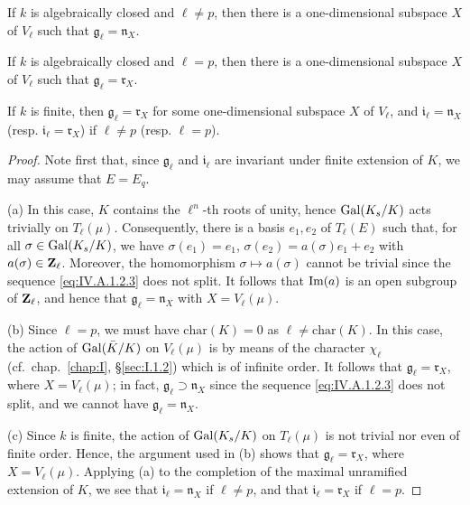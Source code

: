 \begin{theorem}
\begin{alist}
\item If $k$ is algebraically closed and $\ell\neq p$, then there is a
one-dimensional subspace $X$ of $V_\ell$ such that
$\mathfrak{g}_\ell=\mathfrak{n}_X$.
\item If $k$ is algebraically closed and $\ell=p$, then there is a
one-dimensional subspace $X$ of $V_\ell$ such that
$\mathfrak{g}_\ell=\mathfrak{r}_X$.
\item If $k$ is finite, then $\mathfrak{g}_\ell=\mathfrak{r}_X$ for some
one-dimensional subspace $X$ of $V_\ell$, and
$\mathfrak{i}_\ell=\mathfrak{n}_X$ (resp.
$\mathfrak{i}_\ell=\mathfrak{r}_X$) if $\ell\neq p$ (resp. $\ell=p$).
\end{alist}
\end{theorem}

\begin{proof}
Note first that, since $\mathfrak{g}_\ell$ and $\mathfrak{i}_\ell$ are
invariant under finite extension of $K$, we may assume that $E=E_q$.

(a) In this case, $K$ contains the $\ell^n$-th roots of unity, hence
$\mathrm{Gal}(K_s/K)$ acts trivially on $T_\ell(\mu)$. Consequently, there is a
basis $e_1, e_2$ of $T_\ell(E)$ such that, for all
$\sigma\in\mathrm{Gal}(K_s/K)$, we have $\sigma(e_1)=e_1$,
$\sigma(e_2)=a(\sigma)e_1+e_2$ with $a(\sigma)\in\mathbf{Z}_\ell$. Moreover, the
homomorphism $\sigma\longmapsto a(\sigma)$ cannot be trivial since the
sequence \eqref{eq:IV.A.1.2.3} does not split. It follows that
$\mathrm{Im}(a)$ is an open subgroup of $\mathbf{Z}_\ell$, and hence that
$\mathfrak{g}_\ell=\mathfrak{n}_X$ with $X=V_\ell(\mu)$.

(b) Since $\ell=p$, we must have $\mathrm{char}(K)=0$ as
$\ell\neq\mathrm{char}(K)$. In this case, the action of $\mathrm{Gal}(\bar K/K)$
on $V_\ell(\mu)$ is by means of the character $\chi_\ell$
(cf.~chap.~\ref{chap:I}, \S\ref{sec:I.1.2}) which is of infinite order.
It follows that $\mathfrak{g}_\ell=\mathfrak{r}_X$, where
$X=V_\ell(\mu)$; in fact, $\mathfrak{g}_\ell\supset\mathfrak{n}_X$ since
the sequence \eqref{eq:IV.A.1.2.3} does not split, and we cannot have
$\mathfrak{g}_\ell=\mathfrak{n}_X$.

(c) Since $k$ is finite, the action of $\mathrm{Gal}(K_s/K)$ on $T_\ell(\mu)$ is
not trivial nor even of finite order. Hence, the argument used in (b)
shows that $\mathfrak{g}_\ell=\mathfrak{r}_X$, where $X=V_\ell(\mu)$.
Applying (a) to the completion of the maximal unramified extension of
$K$, we see that $\mathfrak{i}_\ell=\mathfrak{n}_X$ if $\ell\neq p$, and
that $\mathfrak{i}_\ell=\mathfrak{r}_X$ if $\ell=p$.
\end{proof}


